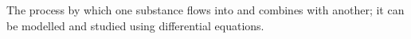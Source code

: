 The process by which one substance flows into and combines
with another; it can be modelled and studied using
differential equations.